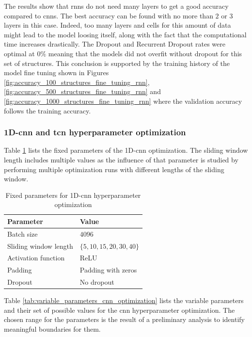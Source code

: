 \documentclass[conference]{IEEEtran}
\begin{document}
The results show that \glspl{rnn} do not need many layers to get a good accuracy compared to \glspl{cnn}. The best accuracy can be found with no more than $ 2 $ or $ 3 $ layers in this case. Indeed, too many layers and cells for this amount of data might lead to the model loosing itself, along with the fact that the computational time increases drastically. The Dropout and Recurrent Dropout rates were optimal at $ 0 \% $ meaning that the models did not overfit without dropout for this set of structures. This conclusion is supported by the training history of the model fine tuning shown in Figures \ref{fig:accuracy_100_structures_fine_tuning_rnn}, \ref{fig:accuracy_500_structures_fine_tuning_rnn} and \ref{fig:accuracy_1000_structures_fine_tuning_rnn} where the validation accuracy follows the training accuracy.

\subsubsection{1D-\gls{cnn} and \gls{tcn} hyperparameter optimization}
\label{sec:cnn_hyperparameter_optimization}

Table \ref{tab:fixed_parameters_cnn_optimization} lists the fixed parameters of the 1D-\gls{cnn} optimization. The sliding window length includes multiple values as the influence of that parameter is studied by performing multiple optimization runs with different lengths of the sliding window.

\begin{table}[htp]
	\centering
	\caption{Fixed parameters for 1D-\gls{cnn} hyperparameter optimization}
	\label{tab:fixed_parameters_cnn_optimization}
	\begin{tabular}{ll}
		\textbf{Parameter} & \textbf{Value} \\
		\hline
		Batch size & $ 4096 $ \\
		Sliding window length & $ \{5, 10, 15, 20, 30, 40\} $ \\
		Activation function & ReLU \\
		Padding & Padding with zeros \\
		Dropout & No dropout
	\end{tabular}
\end{table}

Table \ref{tab:variable_parameters_cnn_optimization} lists the variable parameters and their set of possible values for the \gls{cnn} hyperparameter optimization. The chosen range for the parameters is the result of a preliminary analysis to identify meaningful boundaries for them.
\end{document}
